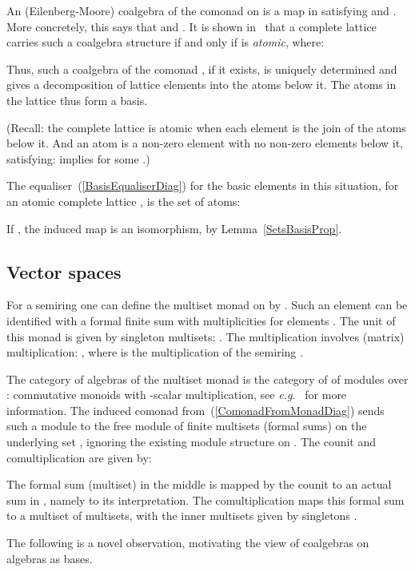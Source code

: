 \documentclass{LMCS}
\begin{document}
An (Eilenberg-Moore) coalgebra of the comonad
 on  is a map  in  satisfying
 and . More concretely, this says that  and . It is
shown in~\cite{Jacobs94b} that a complete lattice  carries
such a coalgebra structure  if and only if  is \emph{atomic},
where:


\noindent Thus, such a coalgebra of the comonad
, if it exists, is uniquely determined and
gives a decomposition of lattice elements into the atoms below it. The
atoms in the lattice thus form a basis.

(Recall: the complete lattice  is atomic when each element is the
join of the atoms below it. And an atom  is a non-zero element
with no non-zero elements below it, satisfying: 
implies  for some .)

The equaliser~(\ref{BasisEqualiserDiag}) for the basic elements in
this situation, for an atomic complete lattice , is the set of
atoms: 
 

\noindent If , the induced map  is an isomorphism, by Lemma~\ref{SetsBasisProp}.



\subsection{Vector spaces}\label{VectorSpaceSubsec}

For a semiring  one can define the multiset monad  on
 by . Such an element 
can be identified with a formal finite sum  with
multiplicities  for elements . The unit of
this monad  is given by
singleton multisets: . The multiplication  involves (matrix)
multiplication: , where  is the multiplication of the
semiring .

The category of algebras  of the multiset monad
 is the category of  of modules over :
commutative monoids with -scalar multiplication, see
\textit{e.g.}~\cite{CoumansJ13} for more information. The induced
comonad  from~(\ref{ComonadFromMonadDiag}) sends such a module
 to the free module  of finite
multisets (formal sums) on the underlying set , ignoring the
existing module structure on . The counit and comultiplication are
given by:


\noindent The formal sum (multiset) in the middle is mapped by the
counit  to an actual sum in , namely to its
interpretation.  The comultiplication  maps this formal sum to
a multiset of multisets, with the inner multisets given by singletons
.

The following is a novel observation, motivating the view of
coalgebras on algebras as bases.
\end{document}
